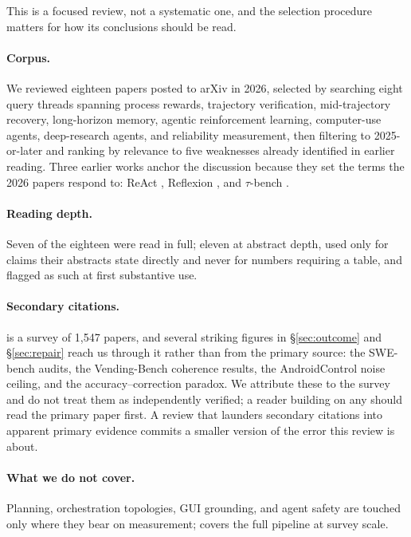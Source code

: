 \documentclass[10pt,twocolumn,a4paper]{article}
\begin{document}
This is a focused review, not a systematic one, and the selection procedure matters for
how its conclusions should be read.

\paragraph{Corpus.}
We reviewed eighteen papers posted to arXiv in 2026, selected by searching eight query
threads spanning process rewards, trajectory verification, mid-trajectory recovery,
long-horizon memory, agentic reinforcement learning, computer-use agents, deep-research
agents, and reliability measurement, then filtering to 2025-or-later and ranking by
relevance to five weaknesses already identified in earlier reading.
Three earlier works anchor the discussion because they set the terms the 2026 papers
respond to: ReAct \citep{yao2023reactsynergizingreasoningacting}, Reflexion
\citep{shinn2023reflexionlanguageagentsverbal}, and $\tau$-bench
\citep{yao2024taubenchbenchmarktoolagentuserinteraction}.

\paragraph{Reading depth.}
Seven of the eighteen were read in full; eleven at abstract depth, used only for claims
their abstracts state directly and never for numbers requiring a table, and flagged as such
at first substantive use.

\paragraph{Secondary citations.}
\citet{chen2026horizongapplanningmemory} is a survey of 1{,}547 papers, and several
striking figures in \S\ref{sec:outcome} and \S\ref{sec:repair} reach us through it rather
than from the primary source: the SWE-bench audits, the Vending-Bench coherence results,
the AndroidControl noise ceiling, and the accuracy--correction paradox.
We attribute these to the survey and do not treat them as independently verified; a reader
building on any should read the primary paper first.
A review that launders secondary citations into apparent primary evidence commits a smaller
version of the error this review is about.

\paragraph{What we do not cover.}
Planning, orchestration topologies, GUI grounding, and agent safety are touched only where
they bear on measurement; \citet{chen2026horizongapplanningmemory} covers the full pipeline
at survey scale.
\end{document}
